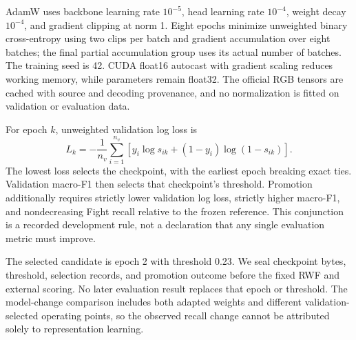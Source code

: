 AdamW \cite{loshchilov2019} uses backbone learning rate $10^{-5}$, head learning rate $10^{-4}$, weight decay $10^{-4}$, and gradient clipping at norm 1. Eight epochs minimize unweighted binary cross-entropy using two clips per batch and gradient accumulation over eight batches; the final partial accumulation group uses its actual number of batches. The training seed is 42. CUDA float16 autocast with gradient scaling reduces working memory, while parameters remain float32. The official RGB tensors are cached with source and decoding provenance, and no normalization is fitted on validation or evaluation data.

For epoch $k$, unweighted validation log loss is
\begin{equation}
L_k=-\frac{1}{n_v}\sum_{i=1}^{n_v}
\left[y_i\log s_{ik}+(1-y_i)\log(1-s_{ik})\right].
\end{equation}
The lowest loss selects the checkpoint, with the earliest epoch breaking exact ties. Validation macro-F1 then selects that checkpoint's threshold. Promotion additionally requires strictly lower validation log loss, strictly higher macro-F1, and nondecreasing Fight recall relative to the frozen reference. This conjunction is a recorded development rule, not a declaration that any single evaluation metric must improve.

The selected candidate is epoch 2 with threshold 0.23. We seal checkpoint bytes, threshold, selection records, and promotion outcome before the fixed RWF and external scoring. No later evaluation result replaces that epoch or threshold. The model-change comparison includes both adapted weights and different validation-selected operating points, so the observed recall change cannot be attributed solely to representation learning.
